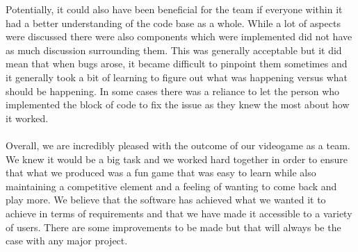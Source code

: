 \documentclass[12pt]{article}
\newcommand{\return}{\\\\\noindent}
\begin{document}
Potentially, it could also have been beneficial for the team if everyone within it had a better understanding of the code base as a whole. While a lot of aspects were discussed there were also components which were implemented did not have as much discussion surrounding them. This was generally acceptable but it did mean that when bugs arose, it became difficult to pinpoint them sometimes and it generally took a bit of learning to figure out what was happening versus what should be happening. In some cases there was a reliance to let the person who implemented the block of code to fix the issue as they knew the most about how it worked.\return
Overall, we are incredibly pleased with the outcome of our videogame as a team. We knew it would be a big task and we worked hard together in order to ensure that what we produced was a fun game that was easy to learn while also maintaining a competitive element and a feeling of wanting to come back and play more. We believe that the software has achieved what we wanted it to achieve in terms of requirements and that we have made it accessible to a variety of users. There are some improvements to be made but that will always be the case with any major project.
\newpage
\end{document}
